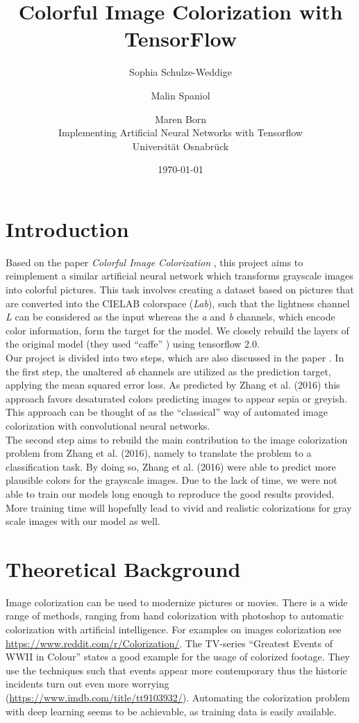 \documentclass[12pt,letterpaper]{article}
\title{Colorful Image Colorization with TensorFlow}
\date{\today}
\author{Sophia Schulze-Weddige \and Malin Spaniol \and Maren Born \\Implementing Artificial Neural Networks with Tensorflow \\Universität Osnabrück}
\begin{document}
\maketitle
\thispagestyle{empty}
\newpage
\thispagestyle{empty}
\tableofcontents
\newpage
\section{Introduction}
Based on the paper \emph{Colorful Image Colorization} \citep{Zhang.2016}, this project aims to reimplement a similar artificial neural network which transforms grayscale images into colorful pictures. This task involves creating a dataset based on pictures that are converted into the CIELAB colorspace (\emph{Lab}), such that the lightness channel \emph{L} can be considered as the input whereas the \emph{a} and \emph{b} channels, which encode color information, form the target for the model. We closely rebuild the layers of the original model (they used \enquote{caffe} \citep{jia2014caffe}) using tensorflow 2.0.\\
Our project is divided into two steps, which are also discussed in the paper \citep{Zhang.2016}. In the first step, the unaltered \emph{ab} channels are utilized as the prediction target, applying the mean squared error loss. As predicted by Zhang et al. (2016) this approach favors desaturated colors predicting images to appear sepia or greyish. This approach can be thought of as the \enquote{classical} way of automated image colorization with convolutional neural networks.\\
The second step aims to rebuild the main contribution to the image colorization problem from Zhang et al. (2016), namely to translate the problem to a classification task. By doing so, Zhang et al. (2016) were able to predict more plausible colors for the grayscale images. Due to the lack of time, we were not able to train our models long enough to reproduce the good results provided. More training time will hopefully lead to vivid and realistic colorizations for gray scale images with our model as well.
\section{Theoretical Background}
Image colorization can be used to modernize pictures or movies. There is a wide range of methods, ranging from hand colorization with photoshop to automatic colorization with artificial intelligence. For examples on images colorization see \url{https://www.reddit.com/r/Colorization/}. The TV-series \enquote{Greatest Events of WWII in Colour} states a good example for the usage of colorized footage. They use the techniques such that events appear more contemporary thus the historic incidents turn out even more worrying (\url{https://www.imdb.com/title/tt9103932/}). 
Automating the colorization problem with deep learning seems to be achievable, as training data is easily available.
\end{document}
